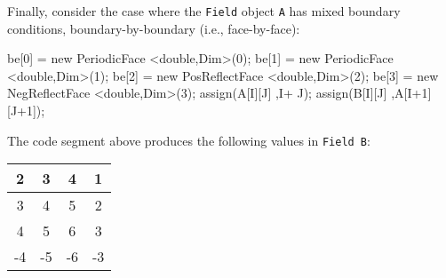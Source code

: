 Finally, consider the case where the \texttt{Field} object \texttt{A} has mixed boundary conditions, boundary-by-boundary (i.e., face-by-face): 
\begin{smallcode}
be[0] = new PeriodicFace <double,Dim>(0); 
be[1] = new PeriodicFace <double,Dim>(1); 
be[2] = new PosReflectFace <double,Dim>(2); 
be[3] = new NegReflectFace <double,Dim>(3);
assign(A[I][J] ,I+ J); 
assign(B[I][J] ,A[I+1][J+1]);
\end{smallcode}
The code segment above produces the following values in \texttt{Field B}: 
\begin{center}
        \begin{tabular}{|c|c|c|c|}
        \hline
        2 & 3 & 4 & 1 \\        \hline
        3 & 4 & 5 & 2 \\        \hline
        4 & 5 & 6 & 3 \\        \hline
         -4 & -5 & -6 & -3 \\        \hline	
        \end{tabular}
   \label{tbl:t6}
\end{center}


